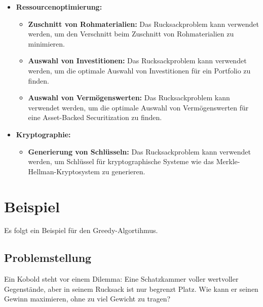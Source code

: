 \documentclass[12pt]{report}
\begin{document}
	\begin{itemize}
		\item \textbf{Ressourcenoptimierung:}
		\begin{itemize}
			\item \textbf{Zuschnitt von Rohmaterialien:} Das Rucksackproblem kann verwendet werden, um den Verschnitt beim Zuschnitt von Rohmaterialien zu minimieren.\cite{kellerer2004knapsack} 
			\item \textbf{Auswahl von Investitionen:} Das Rucksackproblem kann verwendet werden, um die optimale Auswahl von Investitionen für ein Portfolio zu finden.\cite{kellerer2004knapsack}
			\item \textbf{Auswahl von Vermögenswerten:} Das Rucksackproblem kann verwendet werden, um die optimale Auswahl von Vermögenswerten für eine Asset-Backed Securitization zu finden.\cite{kellerer2004knapsack}
		\end{itemize}
		\item \textbf{Kryptographie:}
		\begin{itemize}
			\item \textbf{Generierung von Schlüsseln:} Das Rucksackproblem kann verwendet werden, um Schlüssel für kryptographische Systeme wie das Merkle-Hellman-Kryptosystem zu generieren.\cite{kellerer2004knapsack}
		\end{itemize}
	\end{itemize}


	\section{Beispiel}
		Es folgt ein Beispiel für den Greedy-Algortihmus.
	
		\subsection{Problemstellung}
		Ein Kobold steht vor einem Dilemma: Eine Schatzkammer voller wertvoller Gegenstände, aber in seinem Rucksack ist nur begrenzt Platz. Wie kann er seinen Gewinn maximieren, ohne zu viel Gewicht zu tragen?
		
\end{document}
